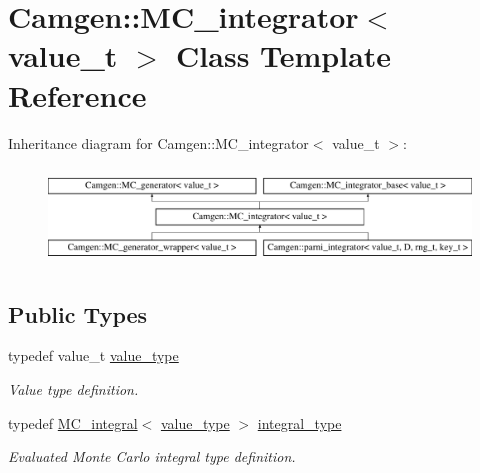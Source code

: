 \hypertarget{a00369}{}\section{Camgen\+:\+:M\+C\+\_\+integrator$<$ value\+\_\+t $>$ Class Template Reference}
\label{a00369}
Inheritance diagram for Camgen\+:\+:M\+C\+\_\+integrator$<$ value\+\_\+t $>$\+:\begin{figure}[H]
\begin{center}
\leavevmode
\includegraphics[height=2.608696cm]{a00369}
\end{center}
\end{figure}
\subsection*{Public Types}
\begin{DoxyCompactItemize}
\item 
\hypertarget{a00369_a06caf6de1272e36a9281c3db764e6f16}{}typedef value\+\_\+t \hyperlink{a00369_a06caf6de1272e36a9281c3db764e6f16}{value\+\_\+type}\label{a00369_a06caf6de1272e36a9281c3db764e6f16}

\begin{DoxyCompactList}\small\item\em Value type definition. \end{DoxyCompactList}\item 
\hypertarget{a00369_a90a2f50ff259fc1a266ee647d39dcf35}{}typedef \hyperlink{a00368}{M\+C\+\_\+integral}$<$ \hyperlink{a00369_a06caf6de1272e36a9281c3db764e6f16}{value\+\_\+type} $>$ \hyperlink{a00369_a90a2f50ff259fc1a266ee647d39dcf35}{integral\+\_\+type}\label{a00369_a90a2f50ff259fc1a266ee647d39dcf35}

\begin{DoxyCompactList}\small\item\em Evaluated Monte Carlo integral type definition. \end{DoxyCompactList}\end{DoxyCompactItemize}
